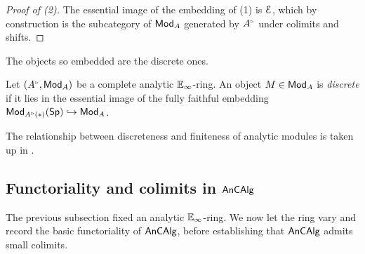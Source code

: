 \begin{proof}[Proof of (2)]
    The essential image of the embedding of (1) is $\EuScript{E}$, which by construction is the subcategory of $\mathsf{Mod}_{A}$ generated by $A^{\tri}$ under colimits and shifts. 
\end{proof}
The objects so embedded are the discrete ones.
\begin{definition}\label{def: discrete modules}
    Let $(A^{\tri},\Mod_{A})$ be a complete analytic $\mathbb{E}_{\infty}$-ring. An object $M\in\mathsf{Mod}_{A}$ is \emph{discrete} if it lies in the essential image of the fully faithful embedding $\Mod_{A^{\tri}(*)}(\Sp)\hookrightarrow\Mod_{A}$. 
\end{definition}
The relationship between discreteness and finiteness of analytic modules is taken up in .
\subsection{Functoriality and colimits in \texorpdfstring{$\mathsf{An}\mathsf{CAlg}$}{AnCAlg}}\label{subsec: functoriality and colimits}
The previous subsection fixed an analytic $\mathbb{E}_{\infty}$-ring. We now let the ring vary and record the basic functoriality of $\mathsf{An}\mathsf{CAlg}$, before establishing that $\mathsf{An}\mathsf{CAlg}$ admits small colimits.


